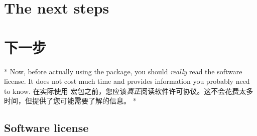 \begin{paracol}{2}
\section{The next steps}\label{uTheNextSteps}
\switchcolumn
\section{下一步}
\switchcolumn[0]*%
Now, before actually using the  package, you should
\emph{really} read the software license. It does not cost much time and
provides information you probably need to know.
\switchcolumn
在实际使用  宏包之前，您应该\emph{真正}阅读软件许可协议。这不会花费太多时间，但提供了您可能需要了解的信息。
\switchcolumn[0]*%
\subsection{Software license}\label{uSoftwareLicense}
\switchcolumn

\end{paracol}
